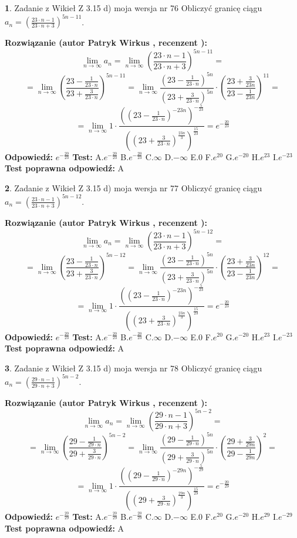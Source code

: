 \documentclass[12pt, a4paper]{article}
\theoremstyle{definition} %
\newtheorem{zad}{}
\newcommand{\zadStart}[1]{\begin{zad}#1\newline}
\newcommand{\zadStop}{\end{zad}}
\newcommand{\rozwStart}[2]{\noindent \textbf{Rozwiązanie (autor #1 , recenzent #2): }\newline}
\newcommand{\rozwStop}{\newline}
\newcommand{\odpStart}{\noindent \textbf{Odpowiedź:}\newline}
\newcommand{\odpStop}{\newline}
\newcommand{\testStart}{\noindent \textbf{Test:}\newline}
\newcommand{\testStop}{\newline}
\newcommand{\kluczStart}{\noindent \textbf{Test poprawna odpowiedź:}\newline}
\newcommand{\kluczStop}{\newline}
\begin{document}
\zadStart{Zadanie z Wikieł Z 3.15 d) moja wersja nr 76}
Obliczyć granicę ciągu $a_{n}=(\frac{23\cdot n - 1}{23 \cdot n + 3})^{5n-11}$.
\zadStop
\rozwStart{Patryk Wirkus}{}
$$\lim\limits_{n\to\infty} a_{n} = \lim\limits_{n\to\infty}(\frac{23\cdot n - 1}{23 \cdot n + 3})^{5n-11}=$$
$$=\lim\limits_{n\to\infty}(\frac{23 - \frac{1}{23\cdot n}}{23 + \frac{3}{23 \cdot n}})^{5n-11}=\lim\limits_{n\to\infty}\frac{(23 - \frac{1}{23\cdot n})^{5n}}{(23 + \frac{3}{23\cdot n})^{5n}} \cdot (\frac{23+\frac{3}{23n}}{23-\frac{1}{23n}})^{11}=$$
$$=\lim\limits_{n\to\infty} 1 \cdot \frac{((23-\frac{1}{23 \cdot n})^{-23n})^{-\frac{5}{23}}}{((23+\frac{3}{23 \cdot n})^{\frac{23n}{3}})^{\frac{15}{23}}} =e^{-\frac{20}{23}}$$
\rozwStop
\odpStart
$e^{-\frac{20}{23}}$
\odpStop
\testStart
A.$ e^{-\frac{20}{23}}$
B.$ e^{-\frac{20}{23}}$
C.$\infty$
D.$-\infty$
E.$0$
F.$e^{20}$
G.$e^{-20}$
H.$e^{23}$
I.$e^{-23}$
\testStop
\kluczStart
A
\kluczStop



\zadStart{Zadanie z Wikieł Z 3.15 d) moja wersja nr 77}
Obliczyć granicę ciągu $a_{n}=(\frac{23\cdot n - 1}{23 \cdot n + 3})^{5n-12}$.
\zadStop
\rozwStart{Patryk Wirkus}{}
$$\lim\limits_{n\to\infty} a_{n} = \lim\limits_{n\to\infty}(\frac{23\cdot n - 1}{23 \cdot n + 3})^{5n-12}=$$
$$=\lim\limits_{n\to\infty}(\frac{23 - \frac{1}{23\cdot n}}{23 + \frac{3}{23 \cdot n}})^{5n-12}=\lim\limits_{n\to\infty}\frac{(23 - \frac{1}{23\cdot n})^{5n}}{(23 + \frac{3}{23\cdot n})^{5n}} \cdot (\frac{23+\frac{3}{23n}}{23-\frac{1}{23n}})^{12}=$$
$$=\lim\limits_{n\to\infty} 1 \cdot \frac{((23-\frac{1}{23 \cdot n})^{-23n})^{-\frac{5}{23}}}{((23+\frac{3}{23 \cdot n})^{\frac{23n}{3}})^{\frac{15}{23}}} =e^{-\frac{20}{23}}$$
\rozwStop
\odpStart
$e^{-\frac{20}{23}}$
\odpStop
\testStart
A.$ e^{-\frac{20}{23}}$
B.$ e^{-\frac{20}{23}}$
C.$\infty$
D.$-\infty$
E.$0$
F.$e^{20}$
G.$e^{-20}$
H.$e^{23}$
I.$e^{-23}$
\testStop
\kluczStart
A
\kluczStop



\zadStart{Zadanie z Wikieł Z 3.15 d) moja wersja nr 78}
Obliczyć granicę ciągu $a_{n}=(\frac{29\cdot n - 1}{29 \cdot n + 3})^{5n-2}$.
\zadStop
\rozwStart{Patryk Wirkus}{}
$$\lim\limits_{n\to\infty} a_{n} = \lim\limits_{n\to\infty}(\frac{29\cdot n - 1}{29 \cdot n + 3})^{5n-2}=$$
$$=\lim\limits_{n\to\infty}(\frac{29 - \frac{1}{29\cdot n}}{29 + \frac{3}{29 \cdot n}})^{5n-2}=\lim\limits_{n\to\infty}\frac{(29 - \frac{1}{29\cdot n})^{5n}}{(29 + \frac{3}{29\cdot n})^{5n}} \cdot (\frac{29+\frac{3}{29n}}{29-\frac{1}{29n}})^{2}=$$
$$=\lim\limits_{n\to\infty} 1 \cdot \frac{((29-\frac{1}{29 \cdot n})^{-29n})^{-\frac{5}{29}}}{((29+\frac{3}{29 \cdot n})^{\frac{29n}{3}})^{\frac{15}{29}}} =e^{-\frac{20}{29}}$$
\rozwStop
\odpStart
$e^{-\frac{20}{29}}$
\odpStop
\testStart
A.$ e^{-\frac{20}{29}}$
B.$ e^{-\frac{20}{29}}$
C.$\infty$
D.$-\infty$
E.$0$
F.$e^{20}$
G.$e^{-20}$
H.$e^{29}$
I.$e^{-29}$
\testStop
\kluczStart
A
\kluczStop
\end{document}
